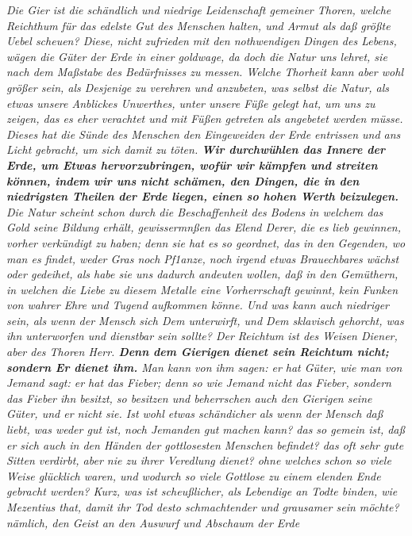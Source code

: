 \textit{Die Gier ist die schändlich und niedrige Leidenschaft gemeiner Thoren, welche
Reichthum für das edelste Gut des Menschen halten, und Armut als daß größte
Uebel scheuen? Diese, nicht zufrieden mit den nothwendigen Dingen des Lebens,
wägen die Güter der Erde in einer goldwage, da doch die Natur uns lehret, sie
nach dem Maßstabe des Bedürfnisses zu messen. Welche Thorheit kann aber wohl
größer sein, als Desjenige zu verehren und anzubeten, was selbst die Natur, als
etwas unsere Anblickes Unwerthes, unter unsere Füße gelegt hat, um uns zu
zeigen, das es eher verachtet und mit Füßen getreten als angebetet werden müsse.
Dieses hat die Sünde des Menschen den Eingeweiden der Erde entrissen und ans
Licht gebracht, um sich damit zu töten. \textbf{Wir durchwühlen das Innere der Erde, um
Etwas hervorzubringen, wofür wir kämpfen und streiten können, indem wir uns
nicht schämen, den Dingen, die in den niedrigsten Theilen der Erde liegen, einen
so hohen Werth beizulegen.} Die Natur scheint schon durch die Beschaffenheit des
Bodens in welchem das Gold seine Bildung erhält, gewissermnßen das Elend Derer,
die es lieb gewinnen, vorher verkündigt zu haben; denn sie hat es so geordnet,
das in den Gegenden, wo man es findet, weder Gras noch Pf1anze, noch irgend
etwas Brauechbares wächst oder gedeihet, als habe sie uns dadurch andeuten
wollen, daß in den Gemüthern, in welchen die Liebe zu diesem Metalle eine
Vorherrschaft gewinnt, kein Funken von wahrer Ehre und Tugend aufkommen könne.
Und was kann auch niedriger sein, als wenn der Mensch sich Dem unterwirft, und
Dem sklavisch gehorcht, was ihn unterworfen und dienstbar sein sollte? Der
Reichtum ist des Weisen Diener, aber des Thoren Herr. \textbf{Denn dem Gierigen dienet
sein Reichtum nicht; sondern Er dienet ihm.} Man kann von ihm sagen: er hat
Güter, wie man von Jemand sagt: er hat das Fieber; denn so wie Jemand nicht das
Fieber, sondern das Fieber ihn besitzt, so besitzen und beherrschen auch den
Gierigen seine Güter, und er nicht sie. Ist wohl etwas schändicher als wenn der
Mensch daß liebt, was weder gut ist, noch Jemanden gut machen kann? das so
gemein ist, daß er sich auch in den Händen der gottlosesten Menschen befindet?
das oft sehr gute Sitten verdirbt, aber nie zu ihrer Veredlung dienet? ohne
welches schon so viele Weise glücklich waren, und wodurch so viele Gottlose zu
einem elenden Ende gebracht werden? Kurz, was ist scheußlicher, als Lebendige an
Todte binden, wie Mezentius that, damit ihr Tod desto schmachtender und
grausamer sein möchte? nämlich, den Geist an den Auswurf und Abschaum der Erde
}

